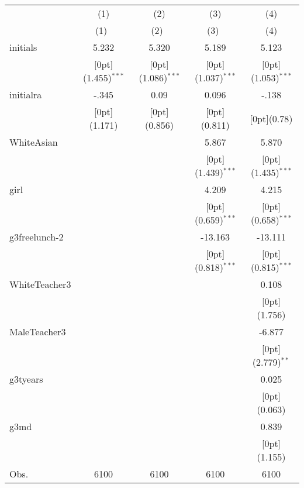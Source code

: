 \begin{tabular*}{\textwidth}{@{\extracolsep{\fill}}lcccc}				
	& \multicolumn{1}{c}{(1)} &	\multicolumn{1}{c}{(2)} &	\multicolumn{1}{c}{(3)} &	\multicolumn{1}{c}{(4)} \\
\cline{2-5}				
	& \multicolumn{1}{c}{(1)\mbox{\ }} &	\multicolumn{1}{c}{(2)\mbox{\ }} &	\multicolumn{1}{c}{(3)\mbox{\ }} &	\multicolumn{1}{c}{(4)} \\
\hline				
initials &	5.232 &	5.320 &	5.189 &	5.123 \\
&	\raisebox{.7ex}[0pt]{\scriptsize (1.455)$^{***}$} &	\raisebox{.7ex}[0pt]{\scriptsize (1.086)$^{***}$} &	\raisebox{.7ex}[0pt]{\scriptsize (1.037)$^{***}$} &	\raisebox{.7ex}[0pt]{\scriptsize (1.053)$^{***}$} \\
initialra &	-.345 &	0.09 &	0.096 &	-.138 \\
&	\raisebox{.7ex}[0pt]{\scriptsize (1.171)} &	\raisebox{.7ex}[0pt]{\scriptsize (0.856)} &	\raisebox{.7ex}[0pt]{\scriptsize (0.811)} &	\raisebox{.7ex}[0pt]{\scriptsize (0.78)} \\
WhiteAsian &	&	&	5.867 &	5.870 \\
&	&	&	\raisebox{.7ex}[0pt]{\scriptsize (1.439)$^{***}$} &	\raisebox{.7ex}[0pt]{\scriptsize (1.435)$^{***}$} \\
girl &	&	&	4.209 &	4.215 \\
&	&	&	\raisebox{.7ex}[0pt]{\scriptsize (0.659)$^{***}$} &	\raisebox{.7ex}[0pt]{\scriptsize (0.658)$^{***}$} \\
g3freelunch-2 &	&	&	-13.163 &	-13.111 \\
&	&	&	\raisebox{.7ex}[0pt]{\scriptsize (0.818)$^{***}$} &	\raisebox{.7ex}[0pt]{\scriptsize (0.815)$^{***}$} \\
WhiteTeacher3 &	&	&	&	0.108 \\
&	&	&	&	\raisebox{.7ex}[0pt]{\scriptsize (1.756)} \\
MaleTeacher3 &	&	&	&	-6.877 \\
&	&	&	&	\raisebox{.7ex}[0pt]{\scriptsize (2.779)$^{**}$} \\
g3tyears &	&	&	&	0.025 \\
&	&	&	&	\raisebox{.7ex}[0pt]{\scriptsize (0.063)} \\
g3md &	&	&	&	0.839 \\
&	&	&	&	\raisebox{.7ex}[0pt]{\scriptsize (1.155)} \\
Obs. &	6100 &	6100 &	6100 &	6100 \\
\hline\hline				
\end{tabular*}%
